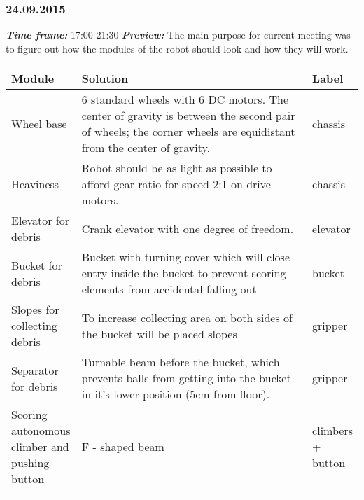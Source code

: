 \subsubsection{24.09.2015}
	\textit{\textbf{Time frame:}} 17:00-21:30 \newline
	\textit{\textbf{Preview:}} The main purpose for current meeting was to figure out how the modules of the robot should look and how they will work. \newline \newline

  \begin{table}[H]
	\vspace{-2mm}
	\begin{center}
		\begin{tabular}{|p{0.2\linewidth}|p{0.7\linewidth}|p{0.1\linewidth}|}
			\hline
			Module & Solution & Label \\
			\hline
			Wheel base & 6 standard wheels with 6 DC motors. The center of gravity is between the second pair of wheels; the corner wheels are equidistant from the center of gravity. & chassis \\
			\hline
			Heaviness & Robot should be as light as possible to afford gear ratio for speed 2:1 on drive motors. & chassis \\
			\hline
			Elevator for debris & Crank elevator with one degree of freedom. & elevator \\
			\hline
			Bucket for debris & Bucket with turning cover which will close entry inside the bucket to prevent scoring elements from accidental falling out & bucket \\
			\hline
			Slopes for collecting debris & To increase collecting area on both sides of the bucket will be placed slopes & gripper \\
			\hline
			Separator for debris & Turnable beam before the bucket, which prevents balls from getting into the bucket in it's lower position (5cm from floor). & gripper \\
			\hline
			Scoring autonomous climber and pushing button & F - shaped beam & climbers + button\\ \\
			\hline
		\end{tabular}
	\end{center}
  \end{table}
  
